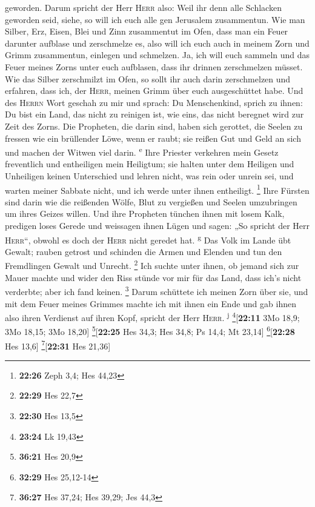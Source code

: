 geworden.  Darum spricht der Herr \textsc{Herr} also:
Weil ihr denn alle Schlacken geworden seid, siehe, so will ich euch alle
gen Jerusalem zusammentun.  Wie man Silber, Erz, Eisen,
Blei und Zinn zusammentut im Ofen, dass man ein Feuer darunter aufblase
und zerschmelze es, also will ich euch auch in meinem Zorn und Grimm
zusammentun, einlegen und schmelzen.  Ja, ich will euch
sammeln und das Feuer meines Zorns unter euch aufblasen, dass ihr
drinnen zerschmelzen müsset.  Wie das Silber zerschmilzt
im Ofen, so sollt ihr auch darin zerschmelzen und erfahren, dass ich,
der \textsc{Herr}, meinen Grimm über euch ausgeschüttet habe.
 Und des \textsc{Herrn} Wort geschah zu mir und sprach:
 Du Menschenkind, sprich zu ihnen: Du bist ein Land, das
nicht zu reinigen ist, wie eins, das nicht beregnet wird zur Zeit des
Zorns.  Die Propheten, die darin sind, haben sich
gerottet, die Seelen zu fressen wie ein brüllender Löwe, wenn er raubt;
sie reißen Gut und Geld an sich und machen der Witwen viel darin.
\textsuperscript{e}  Ihre Priester verkehren mein Gesetz
freventlich und entheiligen mein Heiligtum; sie halten unter dem
Heiligen und Unheiligen keinen Unterschied und lehren nicht, was rein
oder unrein sei, und warten meiner Sabbate nicht, und ich werde unter
ihnen entheiligt. \footnote{\textbf{22:26} Zeph 3,4; Hes 44,23}
 Ihre Fürsten sind darin wie die reißenden Wölfe, Blut zu
vergießen und Seelen umzubringen um ihres Geizes willen. 
Und ihre Propheten tünchen ihnen mit losem Kalk, predigen loses Gerede
und weissagen ihnen Lügen und sagen: „So spricht der Herr
\textsc{Herr}``, obwohl es doch der \textsc{Herr} nicht geredet hat.
\textsuperscript{g}  Das Volk im Lande übt Gewalt; rauben
getrost und schinden die Armen und Elenden und tun den Fremdlingen
Gewalt und Unrecht. \footnote{\textbf{22:29} Hes 22,7} 
Ich suchte unter ihnen, ob jemand sich zur Mauer machte und wider den
Riss stünde vor mir für das Land, dass ich's nicht verderbte; aber ich
fand keinen. \footnote{\textbf{22:30} Hes 13,5}  Darum
schüttete ich meinen Zorn über sie, und mit dem Feuer meines Grimmes
machte ich mit ihnen ein Ende und gab ihnen also ihren Verdienst auf
ihren Kopf, spricht der Herr \textsc{Herr}. \textsuperscript{j}
\footnote{\textbf{23:24} Lk 19,43}{[}\textbf{22:11} 3Mo 18,9; 3Mo 18,15;
3Mo 18,20{]} \footnote{\textbf{36:21} Hes 20,9}{[}\textbf{22:25} Hes
34,3; Hes 34,8; Ps 14,4; Mt 23,14{]} \footnote{\textbf{32:29} Hes
  25,12-14}{[}\textbf{22:28} Hes 13,6{]} \footnote{\textbf{36:27} Hes
  37,24; Hes 39,29; Jes 44,3}{[}\textbf{22:31} Hes 21,36{]}

